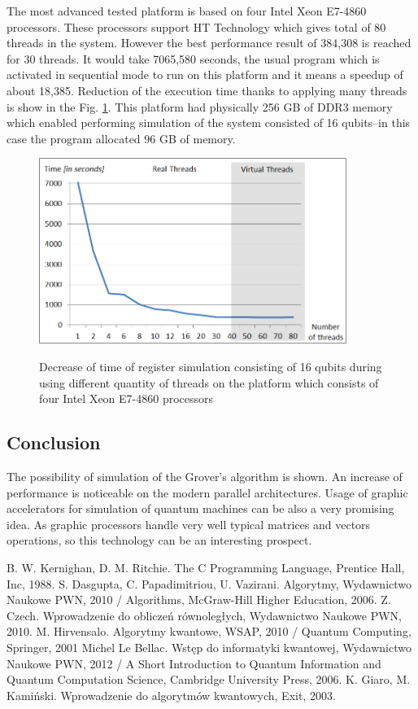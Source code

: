 \documentclass[10pt, a5paper]{article}
\begin{document}
The most advanced tested platform is based on four Intel Xeon E7-4860 processors. These processors support HT Technology which gives total of 80 threads in the system. However the best performance result of 384,308 is reached for 30 threads. It would take 7065,580 seconds, the usual program which is activated in sequential mode to run on this platform and it means a speedup of about 18,385. Reduction of the execution time thanks to applying many threads is show in the Fig. \ref{lf3}. This platform had physically 256 GB of DDR3 memory which enabled performing simulation of the system consisted of 16 qubits--in this case the program allocated 96 GB of memory.

\begin{figure}
  \centering
  \includegraphics[width=10cm]{18_2012_3b.png}
\label{lf3}
\caption{Decrease of time of register simulation consisting of 16 qubits during using different quantity of threads on the platform which consists of four  Intel Xeon E7-4860 processors}
\end{figure}

\subsection*{Conclusion}

The possibility of simulation of the Grover's algorithm is shown. An increase of performance is noticeable on the modern parallel architectures. Usage of graphic accelerators for simulation of quantum machines can be also a very promising idea. As graphic processors handle very well typical matrices and vectors operations, so this technology can be an interesting prospect.

\begin{thebibliography}{9}
   B. W. Kernighan, D. M. Ritchie. The C Programming Language, Prentice Hall, Inc, 1988.
   S. Dasgupta, C. Papadimitriou, U. Vazirani. Algorytmy, Wydawnictwo Naukowe PWN, 2010 / Algorithms, McGraw-Hill Higher Education, 2006.
   Z. Czech. Wprowadzenie do obliczeń równoległych, Wydawnictwo Naukowe PWN, 2010.
   M. Hirvensalo. Algorytmy kwantowe, WSAP, 2010 / Quantum Computing, Springer, 2001
   Michel Le Bellac. Wstęp do informatyki kwantowej, Wydawnictwo Naukowe PWN, 2012 / A Short Introduction to Quantum Information and Quantum Computation Science, Cambridge University Press, 2006.
   K. Giaro, M. Kamiński. Wprowadzenie do algorytmów kwantowych, Exit, 2003.
\end{thebibliography}
\end{document}
